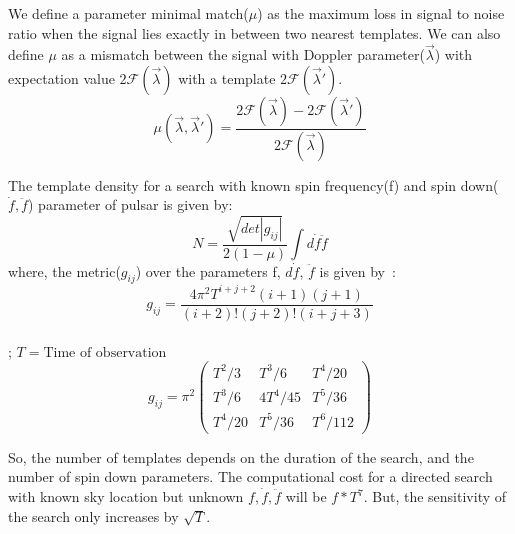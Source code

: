 \documentclass{ttuthes2007}
\begin{document}
We define a parameter minimal match($\mu$) as the maximum loss in signal to
noise ratio when the signal lies exactly in between two nearest templates. 
We can also define $\mu$ as a mismatch between the signal with Doppler
parameter($\vec{\lambda}$) with
expectation value $2\mathcal{F}(\vec{\lambda})$ with a template
$2\mathcal{F}(\vec{\lambda}')$. 
\begin{equation}
\mu(\vec{\lambda},\vec{\lambda}')=\frac{2\mathcal{F}(\vec{\lambda})-2\mathcal{F}(\vec{\lambda}')}{2\mathcal{F}(\vec{\lambda})}
\end{equation}

The template density for a search with known spin frequency(f) and spin
down($\dot{f},\ddot{f}$)
parameter of pulsar is given by:
\begin{equation}
N=\frac{\sqrt{det|g_{ij}|}}{2(1-\mu)}\int d\dot{f}\ddot{f}
\end{equation}
where, the metric($g_{ij}$) over the parameters f, $d\dot{f}$, $\ddot{f}$ is given
by~\cite{Wette_2008}:
\begin{equation}                                                                
g_{ij}=\frac{4\pi^2T^{i+j+2}(i+1)(j+1)}{(i+2)!(j+2)!(i+j+3)}             
\end{equation}\\                                                                
                                                                                
; $T           
=\text{Time of observation}$                                                              
\begin{equation} 
g_{ij} = \pi^2                                                 
\begin{pmatrix}
T^2/3 & T^3/6 & T^4/20 \\                                                       
T^3/6 & 4T^4/45 & T^5/36 \\                                                     
T^4/20 & T^5/36 & T^6/112                                                       
\end{pmatrix}
\end{equation} 

So, the number of templates depends on the duration of the search, and the
number of spin down parameters. The computational cost for a directed search
with known sky location but unknown $f,\dot{f},\ddot{f}$ will be $f*T^7$. But,
the sensitivity of the search only increases by $\sqrt{T}$.
\end{document}
